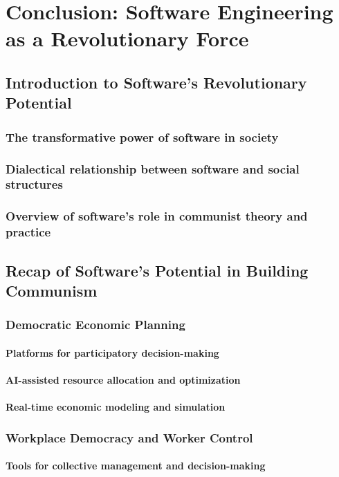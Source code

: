 \chapter{Conclusion: Software Engineering as a Revolutionary Force}

\section{Introduction to Software's Revolutionary Potential}
\subsection{The transformative power of software in society}
\subsection{Dialectical relationship between software and social structures}
\subsection{Overview of software's role in communist theory and practice}

\newpage

\section{Recap of Software's Potential in Building Communism}
\subsection{Democratic Economic Planning}
\subsubsection{Platforms for participatory decision-making}
\subsubsection{AI-assisted resource allocation and optimization}
\subsubsection{Real-time economic modeling and simulation}
\subsection{Workplace Democracy and Worker Control}
\subsubsection{Tools for collective management and decision-making}
